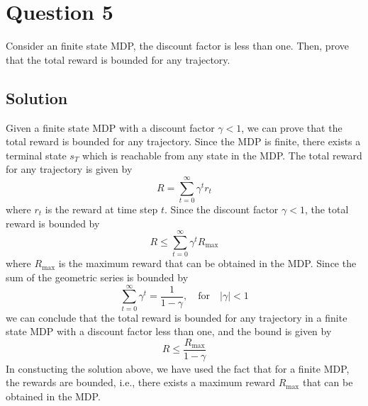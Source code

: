 \section*{Question 5}\label{sec:q5}

Consider an finite state MDP, the discount factor is less than one.
Then, prove that the total reward is bounded for any trajectory.

\subsection*{Solution}

Given a finite state MDP with a discount factor \( \gamma < 1 \), we can prove that the total reward is bounded for any trajectory.
Since the MDP is finite, there exists a terminal state \( s_T \) which is reachable from any state in the MDP.\@
The total reward for any trajectory is given by
\[
    R = \sum_{t=0}^{\infty} \gamma^t r_t
\]
where \( r_t \) is the reward at time step \( t \).
Since the discount factor \( \gamma < 1 \), the total reward is bounded by
\[
    R \leq \sum_{t=0}^{\infty} \gamma^t R_{\text{max}}
\]
where \( R_{\text{max}} \) is the maximum reward that can be obtained in the MDP.\@
Since the sum of the geometric series is bounded by
\[
    \sum_{t=0}^{\infty} \gamma^t = \frac{1}{1 - \gamma}, \quad \text{for} \quad \vert \gamma \vert < 1
\]
we can conclude that the total reward is bounded for any trajectory in a finite state MDP with a discount factor less than one, and the bound is given by
\[
    R \leq \frac{R_{\text{max}}}{1 - \gamma}
\]
In constucting the solution above, we have used the fact that for a finite MDP, the rewards are bounded, i.e., there exists a maximum reward \( R_{\text{max}} \) that can be obtained in the MDP.\@
